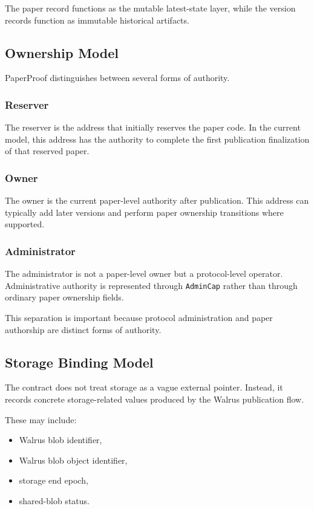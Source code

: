 \documentclass[journal]{IEEEtran}
\begin{document}
The paper record functions as the mutable latest-state layer, while the version records function as immutable historical artifacts.

\subsection{Ownership Model}

PaperProof distinguishes between several forms of authority.

\subsubsection{Reserver}

The reserver is the address that initially reserves the paper code. In the current model, this address has the authority to complete the first publication finalization of that reserved paper.

\subsubsection{Owner}

The owner is the current paper-level authority after publication. This address can typically add later versions and perform paper ownership transitions where supported.

\subsubsection{Administrator}

The administrator is not a paper-level owner but a protocol-level operator. Administrative authority is represented through \texttt{AdminCap} rather than through ordinary paper ownership fields.

This separation is important because protocol administration and paper authorship are distinct forms of authority.

\subsection{Storage Binding Model}

The contract does not treat storage as a vague external pointer. Instead, it records concrete storage-related values produced by the Walrus publication flow.

These may include:
\begin{itemize}
    \item Walrus blob identifier,
    \item Walrus blob object identifier,
    \item storage end epoch,
    \item shared-blob status.
\end{itemize}
\end{document}
